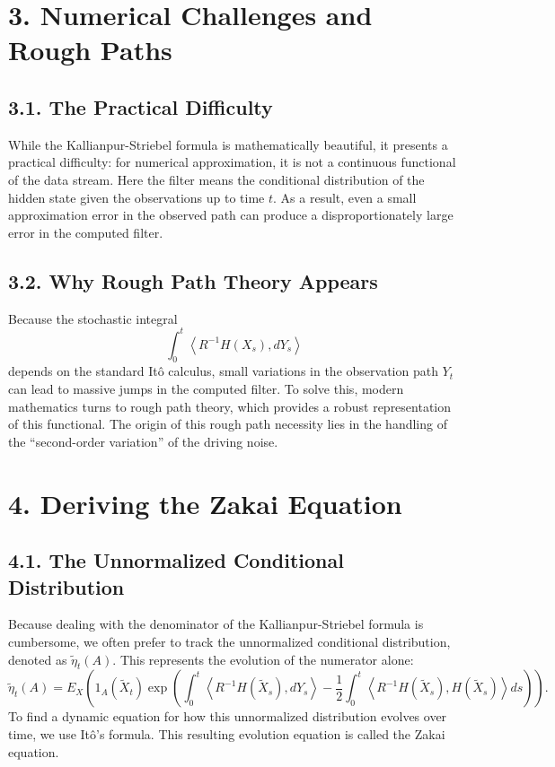 \documentclass[11pt]{article}
\theoremstyle{definition}
\theoremstyle{remark}
\begin{document}
\section*{3. Numerical Challenges and Rough Paths}

\subsection*{3.1. The Practical Difficulty}
While the Kallianpur-Striebel formula is mathematically beautiful, it presents a practical difficulty: for numerical approximation, it is not a continuous functional of the data stream. Here the filter means the conditional distribution of the hidden state given the observations up to time $t$. As a result, even a small approximation error in the observed path can produce a disproportionately large error in the computed filter.

\subsection*{3.2. Why Rough Path Theory Appears}
Because the stochastic integral
\[
\int_0^t \left\langle R^{-1}H(X_s),dY_s\right\rangle
\]
depends on the standard It\^o calculus, small variations in the observation path $Y_t$ can lead to massive jumps in the computed filter. To solve this, modern mathematics turns to rough path theory, which provides a robust representation of this functional. The origin of this rough path necessity lies in the handling of the ``second-order variation'' of the driving noise.

\section*{4. Deriving the Zakai Equation}

\subsection*{4.1. The Unnormalized Conditional Distribution}
Because dealing with the denominator of the Kallianpur-Striebel formula is cumbersome, we often prefer to track the unnormalized conditional distribution, denoted as $\tilde \eta_t(A)$. This represents the evolution of the numerator alone:
\[
\tilde \eta_t(A)=E_X\!\left(
1_A(\tilde X_t)\exp\left(
\int_0^t \left\langle R^{-1}H(\tilde X_s),dY_s\right\rangle
-\frac12\int_0^t \left\langle R^{-1}H(\tilde X_s),H(\tilde X_s)\right\rangle ds
\right)
\right).
\]
To find a dynamic equation for how this unnormalized distribution evolves over time, we use It\^o's formula. This resulting evolution equation is called the Zakai equation.
\end{document}
